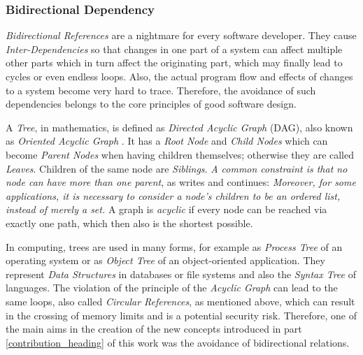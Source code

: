 %
%
%
%
%
%
%

\subsubsection{Bidirectional Dependency}
\label{bidirectional_dependency_heading}

\emph{Bidirectional References} are a nightmare for every software developer.
They cause \emph{Inter-Dependencies} so that changes in one part of a system can
affect multiple other parts which in turn affect the originating part, which may
finally lead to cycles or even endless loops. Also, the actual program flow and
effects of changes to a system become very hard to trace. Therefore, the avoidance
of such dependencies belongs to the core principles of good software design.

A \emph{Tree}, in mathematics, is defined as \textit{Directed Acyclic Graph}
(DAG), also known as \emph{Oriented Acyclic Graph} \cite{nist}. It has a
\emph{Root Node} and \emph{Child Nodes} which can become \emph{Parent Nodes}
when having children themselves; otherwise they are called \emph{Leaves}.
Children of the same node are \emph{Siblings}. \textit{A common constraint is
that no node can have more than one parent}, as \cite{foldoc} writes and
continues: \textit{Moreover, for some applications, it is necessary to consider
a node's children to be an ordered list, instead of merely a set.} A graph is
\emph{acyclic} if every node can be reached via exactly one path, which then
also is the shortest possible.

In computing, trees are used in many forms, for example as \emph{Process Tree}
of an operating system \cite{debian, gnu, linux} or as \emph{Object Tree} of an
object-oriented application. They represent \emph{Data Structures} in databases
or file systems and also the \emph{Syntax Tree} of languages. The violation of
the principle of the \emph{Acyclic Graph} can lead to the same loops, also
called \emph{Circular References}, as mentioned above, which can result in the
crossing of memory limits and is a potential security risk. Therefore, one of
the main aims in the creation of the new concepts introduced in part
\ref{contribution_heading} of this work was the avoidance of bidirectional
relations.
